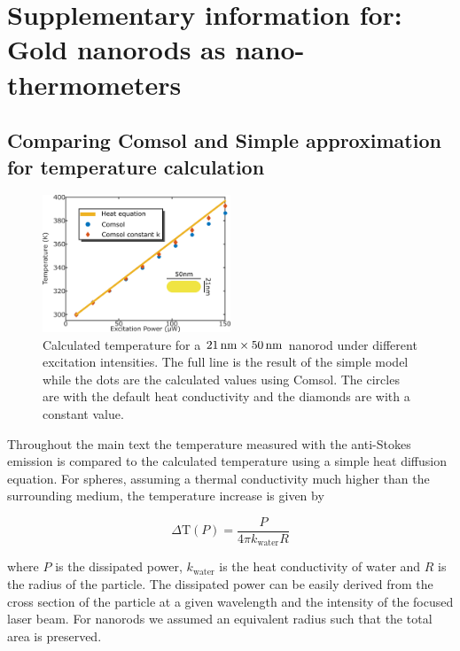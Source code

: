 \chapter[Gold nanorods as nano-thermometers]{Supplementary information for: Gold
nanorods as nano-thermometers}
\label{ch:SAntiStokes}

\section{Comparing Comsol and Simple approximation for temperature calculation}
\begin{figure}[htp] \centering
\includegraphics[width=0.5\textwidth]{Chapters/04_Anti-Stokes/Figures/Supplementary/03_Compare_Comsol/03_Compare_Comsol.png}
\caption{Calculated temperature for a $21\,\textrm{nm}\times 50\,\textrm{nm}$ nanorod under
different excitation intensities. The full line is the result of the simple
model while the dots are the calculated values using Comsol. The circles are
with the default heat conductivity and the diamonds are with a constant value.}
	\label{fig:Compare-Comsol}
\end{figure}

Throughout the main text the temperature measured with the anti-Stokes emission
is compared to the calculated temperature using a simple heat diffusion
equation. For spheres, assuming a thermal conductivity much higher than the
surrounding medium, the temperature increase is given by

\begin{equation}
	\Delta \textrm{T}(P) = \frac{P}{4\pi k_{\textrm{water}} R}
\end{equation}

\noindent where $P$ is the dissipated power, $k_{\textrm{water}}$ is the heat
conductivity of water and $R$ is the radius of the particle. The dissipated power can be
easily derived from the cross section of the particle at a given wavelength and
the intensity of the focused laser beam. For nanorods we assumed an
equivalent radius such that the total area is preserved.


